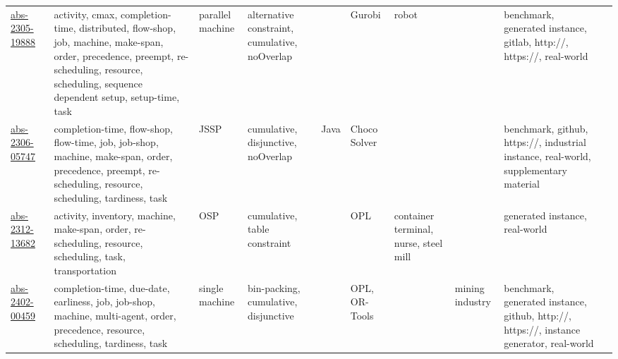 {\begin{longtable}{p{3cm}p{4cm}p{2cm}p{2cm}p{2cm}p{2cm}p{2cm}p{2cm}p{2cm}p{2cm}}
\href{articles/abs-2305-19888.pdf}{abs-2305-19888}~\cite{abs-2305-19888} & activity, cmax, completion-time, distributed, flow-shop, job, machine, make-span, order, precedence, preempt, re-scheduling, resource, scheduling, sequence dependent setup, setup-time, task & parallel machine & alternative constraint, cumulative, noOverlap &  & Gurobi & robot &  & benchmark, generated instance, gitlab, http://, https://, real-world & \\
\href{articles/abs-2306-05747.pdf}{abs-2306-05747}~\cite{abs-2306-05747} & completion-time, flow-shop, flow-time, job, job-shop, machine, make-span, order, precedence, preempt, re-scheduling, resource, scheduling, tardiness, task & JSSP & cumulative, disjunctive, noOverlap & Java & Choco Solver &  &  & benchmark, github, https://, industrial instance, real-world, supplementary material & \\
\href{articles/abs-2312-13682.pdf}{abs-2312-13682}~\cite{abs-2312-13682} & activity, inventory, machine, make-span, order, re-scheduling, resource, scheduling, task, transportation & OSP & cumulative, table constraint &  & OPL & container terminal, nurse, steel mill &  & generated instance, real-world & \\
\href{articles/abs-2402-00459.pdf}{abs-2402-00459}~\cite{abs-2402-00459} & completion-time, due-date, earliness, job, job-shop, machine, multi-agent, order, precedence, resource, scheduling, tardiness, task & single machine & bin-packing, cumulative, disjunctive &  & OPL, OR-Tools &  & mining industry & benchmark, generated instance, github, http://, https://, instance generator, real-world & \\
\end{longtable}
}

